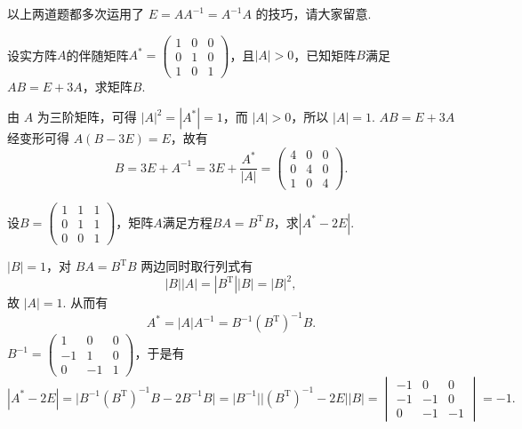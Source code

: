 \begin{exercise}
\begin{exgroup}
\begin{answer}
            以上两道题都多次运用了 $E = AA^{-1} = A^{-1}A$ 的技巧，请大家留意.
        \end{answer}

        \item 设实方阵$A$的伴随矩阵$A^*=\begin{pmatrix}
                1 & 0 & 0 \\ 0 & 1 & 0 \\ 1 & 0 & 1
            \end{pmatrix}$，且$|A|>0$，已知矩阵$B$满足$AB=E+3A$，求矩阵$B$.
        \begin{answer}
            由 $A$ 为三阶矩阵，可得 $|A|^2 = |A^*| = 1$，而 $|A|>0$，所以 $|A|=1$. $AB=E+3A$ 经变形可得 $A(B-3E) = E$，故有
            \[
                B = 3E + A^{-1} = 3E + \frac{A^*}{|A|} = \begin{pmatrix}
                    4 & 0 & 0 \\ 0 & 4 & 0 \\ 1 & 0 & 4
                \end{pmatrix}.
            \]
        \end{answer}

        \item 设$B=\begin{pmatrix}
                1 & 1 & 1 \\ 0 & 1 & 1 \\ 0 & 0 & 1
            \end{pmatrix}$，矩阵$A$满足方程$BA=B^\mathrm{T}B$，求$|A^*-2E|$.
        \begin{answer}
            $|B|=1$，对 $BA=B^\mathrm{T}B$ 两边同时取行列式有
            \[
                |B||A| = |B^\mathrm{T}||B| = |B|^2,
            \]
            故 $|A| = 1$. 从而有
            \[
                A^* = |A|A^{-1} = B^{-1} \left(B^\mathrm{T}\right)^{-1} B.
            \]
            $B^{-1} = \begin{pmatrix}
                1 & 0 & 0 \\ -1 & 1 & 0 \\ 0 & -1 & 1
            \end{pmatrix}$，于是有
            \[
                |A^*-2E| = \lvert B^{-1} \left(B^\mathrm{T}\right)^{-1} B - 2 B^{-1} B \rvert
                         = \lvert B^{-1} \rvert \lvert \left(B^\mathrm{T}\right)^{-1} - 2E \rvert \lvert B \rvert
                         = \begin{vmatrix}
                            -1 & 0 & 0 \\ -1 & -1 & 0 \\ 0 & -1 & -1
                         \end{vmatrix}
                         = -1.
            \]
        \end{answer}


\end{exgroup}
\end{exercise}
